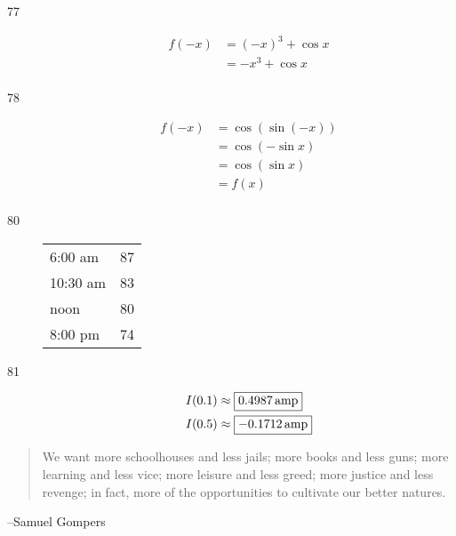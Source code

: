 \documentclass{exam}
\begin{document}
\begin{description}
      \item[77]
        \begin{align*}
          f(-x) & = (-x)^3 + \cos x \\
                & = - x^3 + \cos x \\
        \end{align*}

      \item[78]
        \begin{align*}
          f(-x) & = \cos (\sin (-x)) \\
                & = \cos (- \sin x) \\
                & = \cos (\sin x) \\
                & = f(x) \\
        \end{align*}

      \item[80]
        \begin{tabular}[H]{lr}
          \toprule
          6:00 am  & 87 \\
          10:30 am & 83 \\
          noon     & 80 \\
          8:00 pm  & 74 \\
          \bottomrule
        \end{tabular}

      \item[81]
        \begin{align*}
          I(0.1) & \approx \boxed{ \unit[0.4987]{amp} } \\
          I(0.5) & \approx \boxed{ \unit[-0.1712]{amp} } \\
        \end{align*}
    \end{description}
  \else
    \vspace{9 cm}
    \begin{quote}
      \begin{em}
        We want more schoolhouses and less jails; more books and less guns; more learning and less vice; more
        leisure and less greed; more justice and less revenge; in fact, more of the opportunities to cultivate our
        better natures.
      \end{em}
    \end{quote}
    \hspace{1 cm} --Samuel Gompers
  \fi
\end{document}
